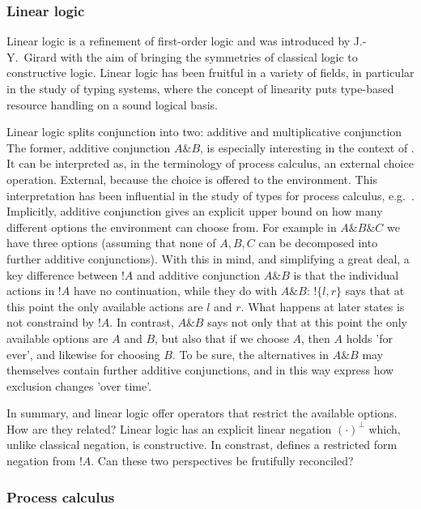 \subsubsection{Linear logic}

Linear logic \cite{GirardJY:linlog,GirardJY:protyp} is a refinement of
first-order logic and was introduced by J.-Y.~Girard with the aim of
bringing the symmetries of classical logic to constructive
logic. Linear logic has been fruitful in a variety of fields, in
particular in the study of typing systems, where the concept of
linearity puts type-based resource handling on a sound logical basis.

Linear logic splits conjunction into two: additive and multiplicative
conjunction The former, additive conjunction $A \& B$, is especially
interesting in the context of \cathoristic{}. It can be interpreted
\cite{AbramskyS:comintoll} as, in the terminology of process calculus,
an external choice operation. External, because the choice is offered
to the environment.  This interpretation has been influential in the
study of types for process calculus,
e.g.~\cite{HondaK:unitypsfsifLONG,TakeuchiK:intbaslaits,HondaK:lanpriatdfscbp}.
Implicitly, additive conjunction gives an explicit upper bound on how
many different options the environment can choose from. For example in
$A \& B \& C$ we have three options (assuming that none of $A, B, C$
can be decomposed into further additive conjunctions).  With this in
mind, and simplifying a great deal, a key difference between $!A$ and
additive conjunction $A \& B$ is that the individual actions in $!A$
have no continuation, while they do with $A \& B$: $!\{l, r\}$ says
that at this point the only available actions are $l$ and $r$. What
happens at later states is not constraind by $!A$.  In contrast, $A \&
B$ says not only that at this point the only available options are $A$
and $B$, but also that if we choose $A$, then $A$ holds 'for ever',
and likewise for choosing $B$. To be sure, the alternatives in $A \&
B$ may themselves contain further additive conjunctions, and in this
way express how exclusion changes 'over time'.

In summary, \cathoristic{} and linear logic offer  operators that restrict
the available options. How are they related? Linear logic has an
explicit linear negation $(\cdot)^{\bot}$ which, unlike classical
negation, is constructive. In constrast, \cathoristic{} defines a restricted
form negation from $!A$. Can these two perspectives be frutifully
reconciled?

\subsubsection{Process calculus}

